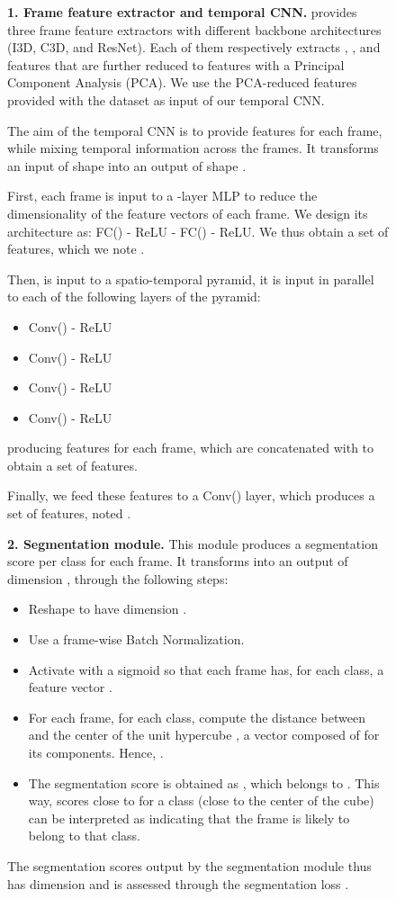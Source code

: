 \documentclass[10pt,twocolumn,letterpaper]{article}
\begin{document}
\begin{figure}[t]
{\begin{minipage}{\linewidth}
\textbf{\color{Orange}1. 
Frame feature extractor and temporal CNN.}
\SoccerNet provides three frame feature extractors with different backbone architectures (I3D, C3D, and ResNet). 
Each of them respectively extracts , , and  features that are further reduced to  features with a Principal Component Analysis (PCA).
We use the PCA-reduced features provided with the dataset as input of our temporal CNN.


The aim of the temporal CNN is to provide  features for each frame, while mixing temporal information across the frames. It transforms an input of shape  into an output of shape .

First, each frame is input to a -layer MLP to reduce the dimensionality of the feature vectors of each frame. We design its architecture as: FC() - ReLU - FC() - ReLU. We thus obtain a set of  features, which we note .

Then,  is input to a spatio-temporal pyramid, \ie it is input in parallel to each of the following layers of the pyramid:
\begin{itemize}
    \item Conv() - ReLU
    \item Conv() - ReLU
    \item Conv() - ReLU
    \item Conv() - ReLU
\end{itemize}
producing  features for each frame, which are concatenated with  to obtain a set of  features. 

Finally, we feed these features to a Conv() layer, which produces a set of  features, noted .

\textbf{\color{NavyBlue}2. Segmentation module.} This module produces a segmentation score per class for each frame. It transforms  into an output of dimension , through the following steps:
\begin{itemize}
    \item Reshape  to have dimension .
    \item Use a frame-wise Batch Normalization. 
    \item Activate with a sigmoid so that each frame has, for each class, a feature vector .
    \item For each frame, for each class, compute the distance  between  and the center of the unit hypercube , \ie a vector composed of  for its  components. Hence, .
    \item The segmentation score is obtained as , which belongs to . This way, scores close to  for a class (\ie  close to the center of the cube) can be interpreted as indicating that the frame is likely to belong to that class.
\end{itemize}
The segmentation scores  output by the segmentation module thus has dimension  and is assessed through the segmentation loss .



\end{minipage}}
\end{figure}
\end{document}
